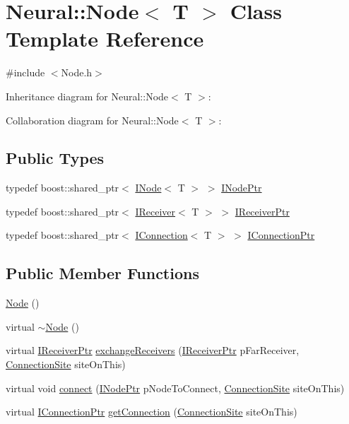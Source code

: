 \hypertarget{class_neural_1_1_node}{
\section{Neural::Node$<$ T $>$ Class Template Reference}
\label{class_neural_1_1_node}
}


{\ttfamily \#include $<$Node.h$>$}



Inheritance diagram for Neural::Node$<$ T $>$:


Collaboration diagram for Neural::Node$<$ T $>$:
\subsection*{Public Types}
\begin{DoxyCompactItemize}
\item 
typedef boost::shared\_\-ptr$<$ \hyperlink{class_neural_1_1_i_node}{INode}$<$ T $>$ $>$ \hyperlink{class_neural_1_1_node_ae2242f73792c89cebc4403da7b2b1a7e}{INodePtr}
\item 
typedef boost::shared\_\-ptr$<$ \hyperlink{class_neural_1_1_i_receiver}{IReceiver}$<$ T $>$ $>$ \hyperlink{class_neural_1_1_node_a4bce103df3f00eee1582929b882c1bf7}{IReceiverPtr}
\item 
typedef boost::shared\_\-ptr$<$ \hyperlink{class_neural_1_1_i_connection}{IConnection}$<$ T $>$ $>$ \hyperlink{class_neural_1_1_node_ac797b836161befa12cd9897926139c14}{IConnectionPtr}
\end{DoxyCompactItemize}
\subsection*{Public Member Functions}
\begin{DoxyCompactItemize}
\item 
\hyperlink{class_neural_1_1_node_afabfd6436d090fad24fdc9fdc6d8abc0}{Node} ()
\item 
virtual \hyperlink{class_neural_1_1_node_a7f82981727140615d188452764284e9a}{$\sim$Node} ()
\item 
virtual \hyperlink{class_neural_1_1_node_a4bce103df3f00eee1582929b882c1bf7}{IReceiverPtr} \hyperlink{class_neural_1_1_node_a8759844824a86063bbc117f5a9b9512e}{exchangeReceivers} (\hyperlink{class_neural_1_1_node_a4bce103df3f00eee1582929b882c1bf7}{IReceiverPtr} pFarReceiver, \hyperlink{namespace_neural_add871cb0324e8abfb693026afba3a621}{ConnectionSite} siteOnThis)
\item 
virtual void \hyperlink{class_neural_1_1_node_a49955ed053b1c7cd7dd348a379e5af74}{connect} (\hyperlink{class_neural_1_1_i_node_a4a023c757a685125232f9a18a5c588b6}{INodePtr} pNodeToConnect, \hyperlink{namespace_neural_add871cb0324e8abfb693026afba3a621}{ConnectionSite} siteOnThis)
\item 
virtual \hyperlink{class_neural_1_1_i_node_a5243be0a422bcddc5a71a79920d09fd1}{IConnectionPtr} \hyperlink{class_neural_1_1_node_ad812d889cfffc34737a79760cfda3c3a}{getConnection} (\hyperlink{namespace_neural_add871cb0324e8abfb693026afba3a621}{ConnectionSite} siteOnThis)
\end{DoxyCompactItemize}
